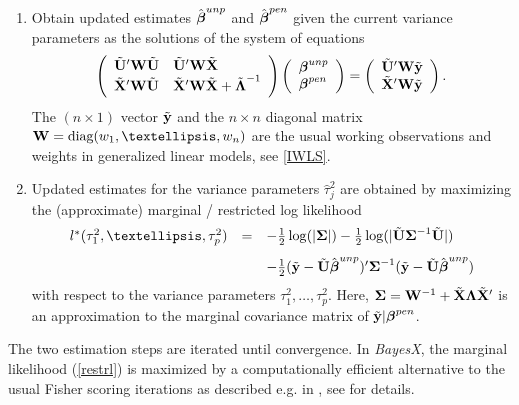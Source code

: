 \documentclass[11pt,a4paper,twoside]{bayesxarticle}
\begin{document}
\begin{enumerate}
\item Obtain updated estimates $\hat{\boldsymbol{\beta}}^{unp}$ and $\hat{\boldsymbol{\beta}}^{pen}$ given the current variance parameters
as the solutions of the system of equations
\begin{equation}
\label{equsystem} \left(
\begin{array}{ll}
\tilde{\Uvec}' \Wvec  \tilde{\Uvec} & \tilde{\Uvec}' \Wvec  \tilde{\Xvec} \\
\tilde{\Xvec}' \Wvec  \tilde{\Uvec} & \tilde{\Xvec}' \Wvec  \tilde{\Xvec} +
\tilde{\Lambdavec}^{-1}
\end{array}
\right) \left(
\begin{array}{l}
\betavec^{unp} \\
\betavec^{pen}
\end{array}
\right) = \left(
\begin{array}{l}
\tilde{\Uvec}' \Wvec \tilde{\yvec} \\
\tilde{\Xvec}'\Wvec \tilde{\yvec}
\end{array}
\right).
\end{equation}
The $(n \times 1)$ vector $\tilde{\mathbf{y}}$ and the $n \times n$ diagonal
matrix $\Wvec = \diag(w_1,\dots,w_n)$ are the usual working observations
and weights in generalized linear models, see \autoref{IWLS}.
\item Updated estimates for the variance parameters $\hat{\tau}_j^2$ are obtained by maximizing
the (approximate) marginal / restricted log likelihood
\begin{equation}
\label{restrl}
\begin{array}{lll}
l^{\ast}(\tau^2_1,\dots,\tau^2_p) & = & -\frac{1}{2}
\log(|\Sigmavec|) - \frac{1}{2} \log(|\tilde{\Uvec} \Sigmavec^{-1}
\tilde{\Uvec}|) \\ [0.3cm] & & - \frac{1}{2} (\tilde{\yvec} - \tilde{\Uvec}
\hat{\betavec}^{unp})' \Sigmavec^{-1} (\tilde{\yvec} - \tilde{\Uvec}
\hat{\betavec}^{unp})
\end{array}
\end{equation}
with respect to the variance parameters $\tau^2_1,\dots,\tau^2_p$.
Here, $\boldsymbol{\Sigma} = \mathbf{W}^{-1} + \tilde{\mathbf{X}} \boldsymbol{\Lambda} \tilde{\mathbf{X}}'$ is an
approximation to the marginal covariance matrix of $\tilde{\mathbf{y}} |
\boldsymbol{\beta}^{pen}$.
\end{enumerate}

The two estimation steps are iterated until convergence. In {\em BayesX}, the marginal likelihood (\ref{restrl}) is maximized
by a computationally efficient alternative to the usual Fisher scoring iterations as described e.g. in , see
 for details.
\end{document}
